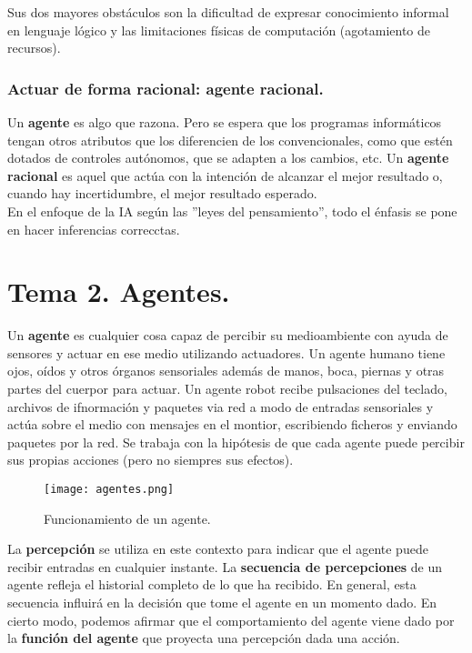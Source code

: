 \documentclass[12pt,spanish]{article}
\numberwithin{definition}{subsection}
\begin{document}
Sus dos mayores obstáculos son la dificultad de expresar conocimiento informal en lenguaje lógico y las limitaciones físicas de computación (agotamiento de recursos).

\subsubsection{Actuar de forma racional: agente racional.}

Un \textbf{agente} es algo que razona. Pero se espera que los programas informáticos tengan otros atributos que los diferencien de los convencionales, como que estén dotados de controles autónomos, que se adapten a los cambios, etc. Un \textbf{agente racional} es aquel que actúa con la intención de alcanzar el mejor resultado o, cuando hay incertidumbre, el mejor resultado esperado.\\

En el enfoque de la IA según las ''leyes del pensamiento'', todo el énfasis se pone en hacer inferencias correcctas.

\section{Tema 2. Agentes.}

Un \textbf{agente} es cualquier cosa capaz de percibir su medioambiente con ayuda de sensores y actuar en ese medio utilizando actuadores. Un agente humano tiene ojos, oídos y otros órganos sensoriales además de manos, boca, piernas y otras partes del cuerpor para actuar. Un agente robot recibe pulsaciones del teclado, archivos de ifnormación y paquetes via red a modo de entradas sensoriales y actúa sobre el medio con mensajes en el montior, escribiendo ficheros y enviando paquetes por la red. Se trabaja con la hipótesis de que cada agente puede percibir sus propias acciones (pero no siempres sus efectos).

\begin{figure}[H]
\centering
\texttt{[image: agentes.png]}
\caption{Funcionamiento de un agente.}
\end{figure}

La \textbf{percepción} se utiliza en este contexto para indicar que el agente puede recibir entradas en cualquier instante. La \textbf{secuencia de percepciones} de un agente refleja el historial completo de lo que ha recibido. En general, esta secuencia influirá en la decisión que tome el agente en un momento dado. En cierto modo, podemos afirmar que el comportamiento del agente viene dado por la \textbf{función del agente} que proyecta una percepción dada una acción.\\
\end{document}
